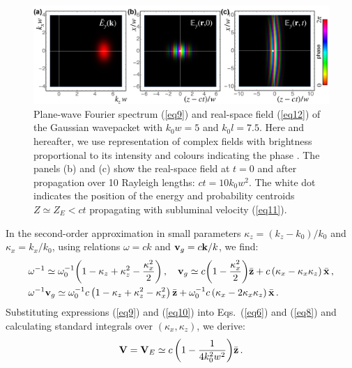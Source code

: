 \documentclass[12pt, a4paper, superscriptaddress, final]{iopart}
\begin{document}
\begin{figure}[!t]
\includegraphics[width=\linewidth]{Fig_1.jpg}
\caption{Plane-wave Fourier spectrum (\ref{eq9}) and real-space field (\ref{eq12}) of the Gaussian wavepacket with $k_0 w = 5$ and $k_0 l = 7.5$. Here and hereafter, we use representation of complex fields with brightness proportional to its intensity and colours indicating the phase \cite{Thaller_book}. The panels (b) and (c) show the real-space field at $t=0$ and after propagation over 10 Rayleigh lengths: $ct = 10 k_0 w^2$. The white dot indicates the position of the energy and probability centroids $Z\simeq Z_E < ct$ propagating with  subluminal velocity (\ref{eq11}).}
\label{fig1}
\end{figure}


In the second-order approximation in small parameters $\kappa_z = (k_z - k_0)/k_0$ and $\kappa_x = k_x / k_0$, using relations $\omega = c k$ and ${\bf v}_g = c {\bf k}/k$, we find:
%
\begin{align}
\label{eq10}
& \omega^{-1} \simeq \omega_0^{-1}\! \left( 1 - \kappa_z + \kappa_z^2 - \frac{\kappa_x^2}{2} \right), \quad
{\bf v}_g \simeq c \!\left( 1 - \frac{\kappa_x^2}{2} \right)\! \bar{\bf z} + c \left(\kappa_x - \kappa_x \kappa_z \right) \bar{\bf x}\,, \nonumber \\
& \omega^{-1} {\bf v}_g \simeq \omega_0^{-1} c \left( 1 - \kappa_z + \kappa_z^2 - {\kappa_x^2} \right) \bar{\bf z} + \omega_0^{-1} c \left(\kappa_x - 2 \kappa_x \kappa_z \right) \bar{\bf x}\,.
 \end{align}
%	
Substituting expressions (\ref{eq9}) and (\ref{eq10}) into Eqs.~(\ref{eq6}) and (\ref{eq8}) and calculating standard integrals over $(\kappa_x, \kappa_z)$, we derive:
%
\begin{equation}
\label{eq11}
{\bf V} = {\bf V}_E \simeq c \left( 1 - \frac{1}{4 k_0^2 w^2} \right)\! \bar{\bf z}\,. 
\end{equation}
%	
\end{document}
